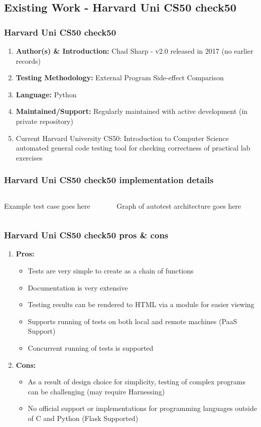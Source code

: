 \documentclass[xcolor]{beamer}
\begin{document}
\subsection{Existing Work - Harvard Uni CS50 check50}
\begin{frame}
	\frametitle{Harvard Uni CS50 check50}
	\begin{enumerate}
		\setlength\itemsep{1em}
		\item \textbf{Author(s) \& Introduction:} Chad Sharp - v2.0 released in 2017 (no earlier records)
			\pause
		\item \textbf{Testing Methodology:} External Program Side-effect Comparison 
			\pause
		\item \textbf{Language:} Python
			\pause
		\item \textbf{Maintained/Support:} Regularly maintained with active development (in private repository)
			\pause 
		\item Current Harvard University CS50: Introduction to Computer Science automated general code testing tool for checking correctness of practical lab exercises
	\end{enumerate}
\end{frame}
\begin{frame}
	\frametitle{Harvard Uni CS50 check50 implementation details}
	\begin{columns}
		\begin{column}{0.45\textwidth}
			Example test case goes here
		\end{column}
		\begin{column}{0.45\textwidth}
			Graph of autotest architecture goes here
		\end{column}
	\end{columns}
\end{frame}
\begin{frame}
	\frametitle{Harvard Uni CS50 check50 pros \& cons}
	\begin{enumerate}
		\item \textbf{Pros:}
		\begin{itemize}
			\item Tests are very simple to create as a chain of functions
			\item Documentation is very extensive
			\item Testing results can be rendered to HTML via a module for easier viewing
			\item Supports running of tests on both local and remote machines (PaaS Support)
			\item Concurrent running of tests is supported 
		\end{itemize}
			\pause
		\item \textbf{Cons:}
		\begin{itemize}
			\item As a result of design choice for simplicity, testing of complex programs can be challenging (may require Harnessing)
			\item No official support or implementations for programming languages outside of C and Python (Flask Supported)
		\end{itemize}
	\end{enumerate}
\end{frame}
\end{document}
